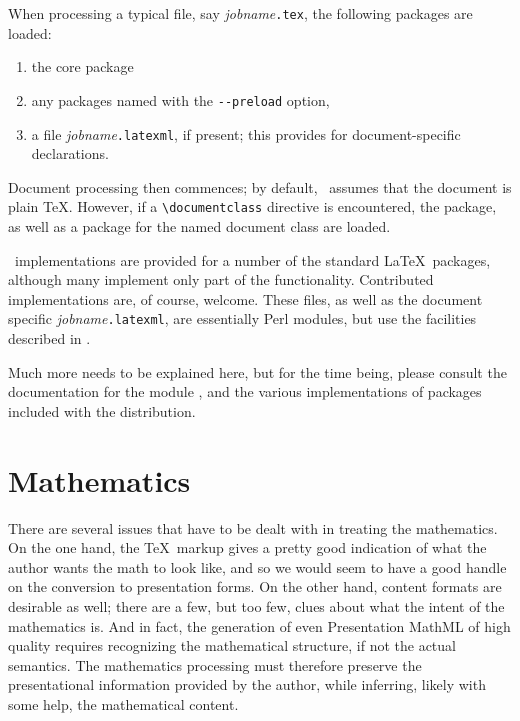 \documentclass{report}
\begin{document}
When processing a typical file, say \textit{jobname}\texttt{.tex}, 
the following packages are loaded:
\begin{enumerate}
\item the core  package
\item any packages named with the \verb|--preload| option,
\item a file \textit{jobname}\texttt{.latexml}, if present;
      this provides for document-specific declarations.
\end{enumerate}
Document processing then commences; by default, \LaTeXML\ assumes that the document is plain \TeX.
However, if a \verb|\documentclass| directive is encountered, the  package, as well
as a package for the named document class are loaded.

\LaTeXML\ implementations are provided for a number of the standard \LaTeX\ packages,
although many implement only part of the functionality.  Contributed implementations are,
of course, welcome.  These files, as well as the document specific \textit{jobname}\texttt{.latexml},
are essentially Perl modules, but use the facilities described in .

Much more needs to be explained here, but for the time being,
please consult the documentation for the module , and
the various implementations of packages included with the distribution.

\chapter{Mathematics}\label{math}
There are several issues that have to be dealt with in treating the mathematics.
On the one hand, the \TeX\ markup gives a pretty good indication of what the
author wants the math to look like, and so we would seem to have a good handle
on the conversion to presentation forms.  On the other hand, content formats
are desirable as well; there are a few, but too few, clues about what the
intent of the mathematics is.  And in fact, the generation of even Presentation
MathML of high quality requires recognizing the mathematical structure, if not
the actual semantics. The mathematics processing must therefore preserve the
presentational information provided by the author, while inferring, likely
with some help, the mathematical content.
\end{document}
